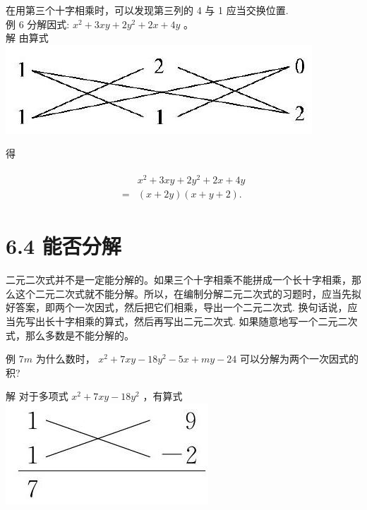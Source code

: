 \documentclass[10pt]{article}
\begin{document}
在用第三个十字相乘时，可以发现第三列的 4 与 1 应当交换位置.\\
例 6 分解因式: $x^{2}+3 x y+2 y^{2}+2 x+4 y$ 。\\
解 由算式\\
\includegraphics[max width=\textwidth, center]{2024_10_30_bd799899fef40368a068g-044}

得

\begin{align*}
\begin{aligned}
& x^{2}+3 x y+2 y^{2}+2 x+4 y \\
= & (x+2 y)(x+y+2) .
\end{aligned}
\end{align*}

\section*{6.4 能否分解}
二元二次式并不是一定能分解的。如果三个十字相乘不能拼成一个长十字相乘，那么这个二元二次式就不能分解。所以，在编制分解二元二次式的习题时，应当先拟好答案，即两个一次因式，然后把它们相乘，导出一个二元二次式. 换句话说，应当先写出长十字相乘的算式，然后再写出二元二次式. 如果随意地写一个二元二次式，那么多数是不能分解的。

例 $7 m$ 为什么数时， $x^{2}+7 x y-18 y^{2}-5 x+m y-24$ 可以分解为两个一次因式的积?

解 对于多项式 $x^{2}+7 x y-18 y^{2}$ ，有算式\\
\includegraphics[max width=\textwidth, center]{2024_10_30_bd799899fef40368a068g-045(2)}
\end{document}
